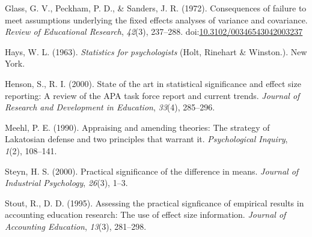 \documentclass[man]{apa6}
\begin{document}
\leavevmode\hypertarget{ref-Glass_et_al_1972}{}%
Glass, G. V., Peckham, P. D., \& Sanders, J. R. (1972). Consequences of failure to meet assumptions underlying the fixed effects analyses of variance and covariance. \emph{Review of Educational Research}, \emph{42}(3), 237--288. doi:\href{https://doi.org/10.3102/00346543042003237}{10.3102/00346543042003237}

\leavevmode\hypertarget{ref-Hays_1963}{}%
Hays, W. L. (1963). \emph{Statistics for psychologists} (Holt, Rinehart \& Winston.). New York.

\leavevmode\hypertarget{ref-Henson_Smith_2000}{}%
Henson, S., R. I. (2000). State of the art in statistical significance and effect size reporting: A review of the APA task force report and current trends. \emph{Journal of Research and Development in Education}, \emph{33}(4), 285--296.

\leavevmode\hypertarget{ref-Meehl_1990}{}%
Meehl, P. E. (1990). Appraising and amending theories: The strategy of Lakatosian defense and two principles that warrant it. \emph{Psychological Inquiry}, \emph{1}(2), 108--141.

\leavevmode\hypertarget{ref-Steyn_2000}{}%
Steyn, H. S. (2000). Practical significance of the difference in means. \emph{Journal of Industrial Psychology}, \emph{26}(3), 1--3.

\leavevmode\hypertarget{ref-Stout_Ruble_1995}{}%
Stout, R., D. D. (1995). Assessing the practical signficance of empirical results in accounting education research: The use of effect size information. \emph{Journal of Accounting Education}, \emph{13}(3), 281--298.
\end{document}
